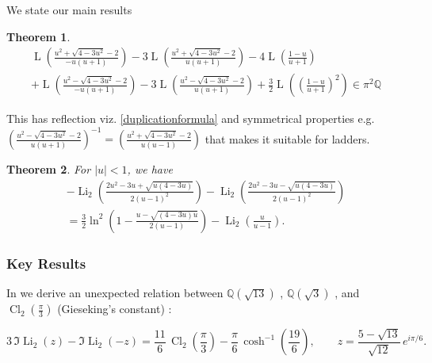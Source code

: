 \documentclass[12pt]{article}
\newtheorem{theorem}{Theorem}
\begin{document}
We state our main results

\begin{theorem}\label{firstformatladder}
\begin{multline}
 \operatorname{L}\left( \frac{u^2 + \sqrt{4 - 3u^2} - 2}{-u(u + 1)} \right) 
 - 3 \operatorname{L}\left( \frac{u^2 + \sqrt{4 - 3u^2} - 2}{u(u + 1)} \right) 
 - 4 \operatorname{L}\left( \frac{1 - u}{u + 1} \right) \\ 
 + \operatorname{L}\left( \frac{u^2 - \sqrt{4 - 3u^2} - 2}{-u(u + 1)} \right) 
 - 3 \operatorname{L}\left( \frac{u^2 - \sqrt{4 - 3u^2} - 2}{u(u + 1)} \right) 
 + \frac{3}{2} \operatorname{L}\left( \left( \frac{1 - u}{u + 1} \right)^2 \right)\in \pi^2 \mathbb{Q} 
\label{eq:ladder2} 
\end{multline}
\end{theorem}

\noindent This has reflection viz. \eqref{duplicationformula} and symmetrical  properties e.g. $\left(\frac{u^2 - \sqrt{4 - 3u^2} - 2}{u(u + 1)}\right)^{-1}
= \left(\frac{u^2 + \sqrt{4 - 3u^2} - 2}{u(u - 1)}\right)$ that makes it suitable for ladders.

\begin{theorem}\label{previouslymaster}
For $|u|<1$, we have
\begin{multline}
- \operatorname{Li}_2\!\left( \frac{2u^2 - 3u + \sqrt{u(4-3u)}}{2(u-1)^2} \right)
- \operatorname{Li}_2\!\left( \frac{2u^2 - 3u - \sqrt{u(4-3u)}}{2(u-1)^2} \right) \\
= \frac{3}{2} \ln^2\!\left( 1 - \frac{u - \sqrt{(4 - 3u)u}}{2(u-1)} \right)
- \operatorname{Li}_2\!\left( \frac{u}{u - 1} \right).
\label{eq:ladder}
\end{multline}
\end{theorem}

\subsubsection{Key Results}

In  we derive an unexpected relation between $\mathbb{Q}(\sqrt{13})$ , $\mathbb{Q}(\sqrt{3})$ , and   $\operatorname{Cl}_2\left(\frac{\pi}{3}\right)$ (Gieseking's constant) :

\begin{equation}
3\,\Im\operatorname{Li}_2(z)-\Im\operatorname{Li}_2(-z)
=\frac{11}{6}\,\operatorname{Cl}_2\!\left(\frac{\pi}{3}\right)
-\frac{\pi}{6}\,\cosh^{-1}\!\left(\frac{19}{6}\right),
\qquad
z=\frac{5-\sqrt{13}}{\sqrt{12}}\,e^{i\pi/6}.
\end{equation}
\end{document}
